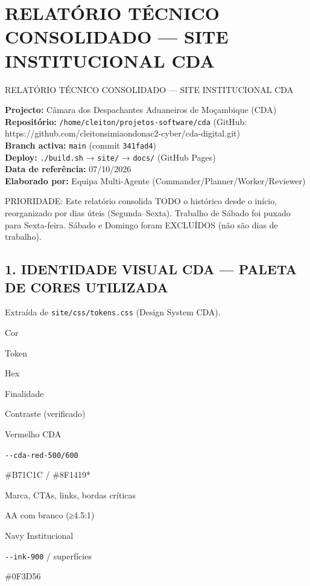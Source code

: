 \section{RELATÓRIO TÉCNICO CONSOLIDADO --- SITE INSTITUCIONAL
CDA}\label{relatuxf3rio-tuxe9cnico-consolidado-site-institucional-cda}

RELATÓRIO TÉCNICO CONSOLIDADO --- SITE INSTITUCIONAL CDA

\textbf{Projecto:} Câmara dos Despachantes Aduaneiros de Moçambique
(CDA)\\
\textbf{Repositório:} \texttt{/home/cleiton/projetos-software/cda}
(GitHub:
https://github.com/cleitonsimiaondonac2-cyber/cda-digital.git)\\
\textbf{Branch activa:} \texttt{main} (commit \texttt{341fad4})\\
\textbf{Deploy:} \texttt{./build.sh} → \texttt{site/} → \texttt{docs/}
(GitHub Pages)\\
\textbf{Data de referência:} 07/10/2026\\
\textbf{Elaborado por:} Equipa Multi-Agente
(Commander/Planner/Worker/Reviewer)

PRIORIDADE: Este relatório consolida TODO o histórico desde o início,
reorganizado por dias úteis (Segunda--Sexta). Trabalho de Sábado foi
puxado para Sexta-feira. Sábado e Domingo foram EXCLUÍDOS (não são dias
de trabalho).

\subsection{1. IDENTIDADE VISUAL CDA --- PALETA DE CORES
UTILIZADA}\label{identidade-visual-cda-paleta-de-cores-utilizada}

Extraída de \texttt{site/css/tokens.css} (Design System CDA).

Cor

Token

Hex

Finalidade

Contraste (verificado)

Vermelho CDA

\texttt{-\/-cda-red-500/600}

\#B71C1C / \#8F1419*

Marca, CTAs, links, bordas críticas

AA com branco (≥4.5:1)

Navy Institucional

\texttt{-\/-ink-900} / superfícies

\#0F3D56

